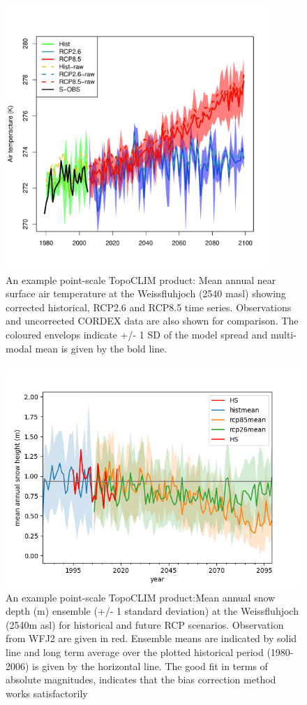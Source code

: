 \documentclass[hess, manuscript]{copernicus}
\begin{document}
\begin{figure}[t]
\includegraphics[width=10cm]{"plots/tasTS2.pdf"}
\caption{An example point-scale TopoCLIM product: Mean annual near surface air temperature at the Weissfluhjoch (2540 masl) showing corrected historical, RCP2.6 and RCP8.5 time series. Observations and uncorrected CORDEX data are also shown for comparison. The coloured envelops indicate +/- 1 SD of the model spread and multi-modal mean is given by the bold line. }
\end{figure}



\begin{figure}[t]
\includegraphics[width=12cm]{"plots/HS_clim.png"}
\caption{An example point-scale TopoCLIM product:Mean annual snow depth (m) ensemble (+/- 1 standard deviation) at the Weissfluhjoch (2540m asl) for historical and future RCP scenarios. Observation from WFJ2 are given in red. Ensemble means are indicated by solid line and long term average over the plotted historical period (1980-2006) is given by the horizontal line. The good fit in terms of absolute magnitudes, indicates that the bias correction method works satisfactorily }
\end{figure}
\end{document}
